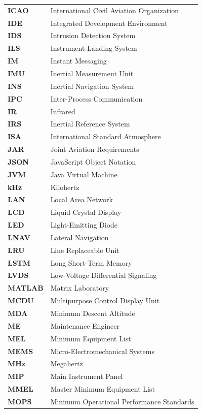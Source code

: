 \begin{longtable}{p{3cm}p{11cm}}
\textbf{ICAO} & International Civil Aviation Organization \\
\textbf{IDE} & Integrated Development Environment \\
\textbf{IDS} & Intrusion Detection System \\
\textbf{ILS} & Instrument Landing System \\
\textbf{IM} & Instant Messaging \\
\textbf{IMU} & Inertial Measurement Unit \\
\textbf{INS} & Inertial Navigation System \\
\textbf{IPC} & Inter-Process Communication \\
\textbf{IR} & Infrared \\
\textbf{IRS} & Inertial Reference System \\
\textbf{ISA} & International Standard Atmosphere \\
\textbf{JAR} & Joint Aviation Requirements \\
\textbf{JSON} & JavaScript Object Notation \\
\textbf{JVM} & Java Virtual Machine \\
\textbf{kHz} & Kilohertz \\
\textbf{LAN} & Local Area Network \\
\textbf{LCD} & Liquid Crystal Display \\
\textbf{LED} & Light-Emitting Diode \\
\textbf{LNAV} & Lateral Navigation \\
\textbf{LRU} & Line Replaceable Unit \\
\textbf{LSTM} & Long Short-Term Memory \\
\textbf{LVDS} & Low-Voltage Differential Signaling \\
\textbf{MATLAB} & Matrix Laboratory \\
\textbf{MCDU} & Multipurpose Control Display Unit \\
\textbf{MDA} & Minimum Descent Altitude \\
\textbf{ME} & Maintenance Engineer \\
\textbf{MEL} & Minimum Equipment List \\
\textbf{MEMS} & Micro-Electromechanical Systems \\
\textbf{MHz} & Megahertz \\
\textbf{MIP} & Main Instrument Panel \\
\textbf{MMEL} & Master Minimum Equipment List \\
\textbf{MOPS} & Minimum Operational Performance Standards \\

\end{longtable}
